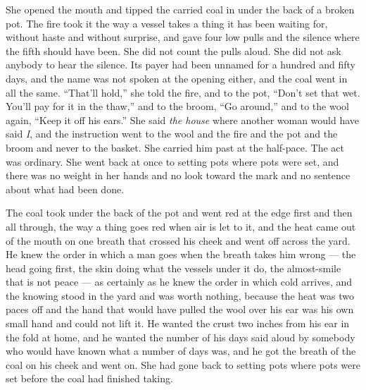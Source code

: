 She opened the mouth and tipped the carried coal in under the back of a broken pot. The fire took it the way a vessel takes a thing it has been waiting for, without haste and without surprise, and gave four low pulls and the silence where the fifth should have been. She did not count the pulls aloud. She did not ask anybody to hear the silence. Its payer had been unnamed for a hundred and fifty days, and the name was not spoken at the opening either, and the coal went in all the same. “That'll hold,” she told the fire, and to the pot, “Don't set that wet. You'll pay for it in the thaw,” and to the broom, “Go around,” and to the wool again, “Keep it off his ears.” She said \emph{the house} where another woman would have said \emph{I}, and the instruction went to the wool and the fire and the pot and the broom and never to the basket. She carried him past at the half-pace. The act was ordinary. She went back at once to setting pots where pots were set, and there was no weight in her hands and no look toward the mark and no sentence about what had been done.

The coal took under the back of the pot and went red at the edge first and then all through, the way a thing goes red when air is let to it, and the heat came out of the mouth on one breath that crossed his cheek and went off across the yard. He knew the order in which a man goes when the breath takes him wrong --- the head going first, the skin doing what the vessels under it do, the almost-smile that is not peace --- as certainly as he knew the order in which cold arrives, and the knowing stood in the yard and was worth nothing, because the heat was two paces off and the hand that would have pulled the wool over his ear was his own small hand and could not lift it. He wanted the crust two inches from his ear in the fold at home, and he wanted the number of his days said aloud by somebody who would have known what a number of days was, and he got the breath of the coal on his cheek and went on. She had gone back to setting pots where pots were set before the coal had finished taking.

